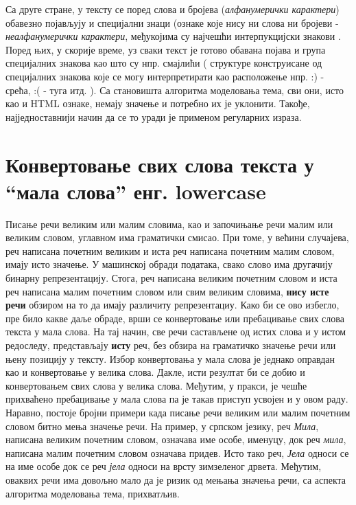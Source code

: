 Са друге стране, у тексту се поред слова и бројева (\textit{алфанумерички карактери}) обавезно појављују и специјални знаци (ознаке које нису ни слова ни бројеви - \textit{неалфанумерички карактери}, међукојима су најчешћи интерпукцијски знакови . Поред њих, у скорије време, уз сваки текст је готово обавана појава и група специјалних знакова као што су нпр. смајлићи ( структуре конструисане од специјалних знакова које се могу интерпретирати као расположење нпр. :) - срећа, :( - туга  итд. ). Са становишта алгоритма моделовања тема, сви они, исто као и HTML ознаке, немају значење и потребно их је уклонити. Такође, најједноставнији начин да се то уради је применом регуларних израза.

	\section{Конвертовање свих слова текста у "`мала слова"'  енг. lowercase }

Писање речи великим или малим словима, као и започињање речи малим или великим словом, углавном има граматички смисао. При томе, у већини случајева, реч написана почетним великим и иста реч написана почетним  малим словом, имају исто значење. У машинској обради података, свако слово има другачију бинарну репрезентацију. Стога, реч написана великим почетним словом и иста реч написана малим почетним словом или свим великим словима, \textbf{нису исте речи} обзиром на то да имају различиту репрезентациу. Како би се ово избегло, пре било какве даље обраде, врши се конвертовање или пребацивање свих слова текста у мала слова. На тај начин, све речи састављене од истих слова и у истом редоследу, представљају \textbf{исту} реч, без обзира на граматичко значење речи или њену позицију у тексту. Избор конвертовања у мала слова је једнако оправдан као и  конвертовање у велика слова. Дакле, исти резултат би се добио и конвертовањем свих слова у велика слова. Међутим, у пракси, је чешће прихваћено пребацивање у мала слова па је такав приступ усвојен и у овом раду.
Наравно, постоје бројни примери када писање речи великим или малим почетним словом битно мења значење речи. На пример, у српском језику, реч \textit{Мила}, написана великим почетним словом, означава име особе, именуцу, док реч \textit{мила}, написана малим почетним словом означава придев. Исто тако реч, \textit{Јела} односи се на име особе док се реч \textit{јела} односи на врсту зимзеленог дрвета. 
Међутим, оваквих речи има довољно мало да је ризик од мењања значења речи, са аспекта алгоритма моделовања тема, прихватљив.


